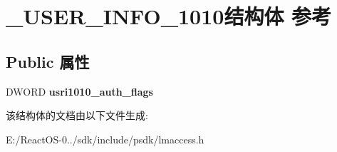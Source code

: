 \hypertarget{struct___u_s_e_r___i_n_f_o__1010}{}\section{\+\_\+\+U\+S\+E\+R\+\_\+\+I\+N\+F\+O\+\_\+1010结构体 参考}
\label{struct___u_s_e_r___i_n_f_o__1010}
\subsection*{Public 属性}
\begin{DoxyCompactItemize}
\item 
\mbox{\label{struct___u_s_e_r___i_n_f_o__1010_a22ba1c8c0c59bf80f6b2b9db6c0b6f6d}} 
D\+W\+O\+RD {\bfseries usri1010\+\_\+auth\+\_\+flags}
\end{DoxyCompactItemize}


该结构体的文档由以下文件生成\+:\begin{DoxyCompactItemize}
\item 
E\+:/\+React\+O\+S-\/0../sdk/include/psdk/lmaccess.\+h\end{DoxyCompactItemize}
